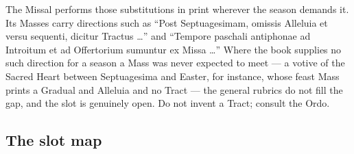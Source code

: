 The Missal performs those substitutions in print wherever the season demands
it. Its Masses carry directions such as ``Post Septuagesimam, omissis Alleluia
et versu sequenti, dicitur Tractus \dots{}'' and ``Tempore paschali antiphonae
ad Introitum et ad Offertorium sumuntur ex Missa  \dots{}''
Where the book supplies no such direction for a season a Mass was never
expected to meet --- a votive of the Sacred Heart between Septuagesima and
Easter, for instance, whose feast Mass prints a Gradual and Alleluia and no
Tract --- the general rubrics do not fill the gap, and the slot is genuinely
open. Do not invent a Tract; consult the Ordo.

\subsection{The slot map}

